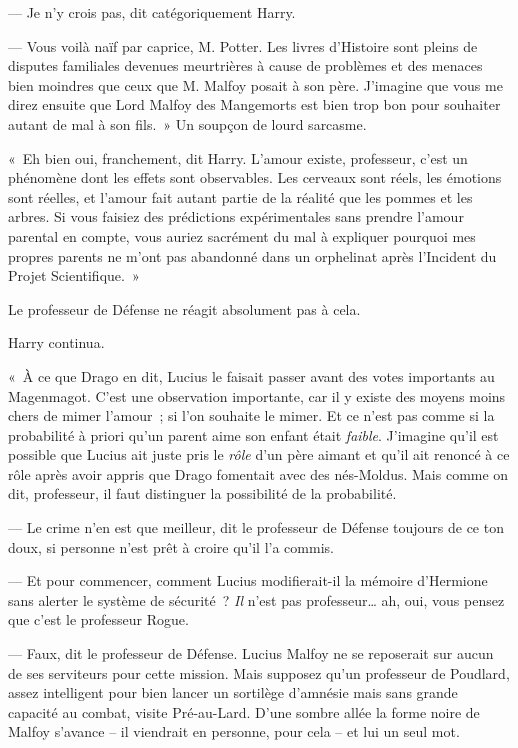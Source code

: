 --- Je n'y crois pas, dit catégoriquement Harry.

--- Vous voilà naïf par caprice, M. Potter. Les livres d'Histoire sont pleins de disputes familiales devenues meurtrières à cause de problèmes et des menaces bien moindres que ceux que M. Malfoy posait à son père. J'imagine que vous me direz ensuite que Lord Malfoy des Mangemorts est bien trop bon pour souhaiter autant de mal à son fils.~» Un soupçon de lourd sarcasme.

«~Eh bien oui, franchement, dit Harry. L'amour existe, professeur, c'est un phénomène dont les effets sont observables. Les cerveaux sont réels, les émotions sont réelles, et l'amour fait autant partie de la réalité que les pommes et les arbres. Si vous faisiez des prédictions expérimentales sans prendre l'amour parental en compte, vous auriez sacrément du mal à expliquer pourquoi mes propres parents ne m'ont pas abandonné dans un orphelinat après l'Incident du Projet Scientifique.~»

Le professeur de Défense ne réagit absolument pas à cela.

Harry continua.

«~À ce que Drago en dit, Lucius le faisait passer avant des votes importants au Magenmagot. C'est une observation importante, car il y existe des moyens moins chers de mimer l'amour~; si l'on souhaite le mimer. Et ce n'est pas comme si la probabilité à priori qu'un parent aime son enfant était \emph{faible}. J'imagine qu'il est possible que Lucius ait juste pris le \emph{rôle} d'un père aimant et qu'il ait renoncé à ce rôle après avoir appris que Drago fomentait avec des nés-Moldus. Mais comme on dit, professeur, il faut distinguer la possibilité de la probabilité.

--- Le crime n'en est que meilleur, dit le professeur de Défense toujours de ce ton doux, si personne n'est prêt à croire qu'il l'a commis.

--- Et pour commencer, comment Lucius modifierait-il la mémoire d'Hermione sans alerter le système de sécurité~? \emph{Il} n'est pas professeur… ah, oui, vous pensez que c'est le professeur Rogue.

--- Faux, dit le professeur de Défense. Lucius Malfoy ne se reposerait sur aucun de ses serviteurs pour cette mission. Mais supposez qu'un professeur de Poudlard, assez intelligent pour bien lancer un sortilège d'amnésie mais sans grande capacité au combat, visite Pré-au-Lard. D'une sombre allée la forme noire de Malfoy s'avance -- il viendrait en personne, pour cela -- et lui un seul mot.


